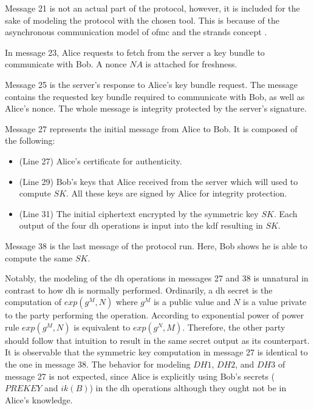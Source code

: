 \par
Message 21 is not an actual part of the protocol, however, it is included for the sake of modeling the protocol with the chosen tool. This is because of the asynchronous communication model of \gls{ofmc} and the strands concept \cite{ofmcTut}.
\par 
In message 23, Alice requests to fetch from the server a key bundle to communicate with Bob. A nonce $NA$ is attached for freshness.
\par
Message 25 is the server's response to Alice's key bundle request. The message contains the requested key bundle required to communicate with Bob, as well as Alice's nonce. The whole message is integrity protected by the server's signature.
\par
Message 27 represents the initial message from Alice to Bob. It is composed of the following:
\begin{itemize}
	\item (Line 27) Alice's certificate for authenticity.
	\item (Line 29) Bob's keys that Alice received from the server which will used to compute $SK$. All these keys are signed by Alice for integrity protection.
	\item (Line 31) The initial ciphertext encrypted by the symmetric key $SK$. Each output of the four \gls{dh} operations is input into the \gls{kdf} resulting in $SK$.
\end{itemize}
Message 38 is the last message of the protocol run. Here, Bob shows he is able to compute the same $SK$. 
\par
Notably, the modeling of the \gls{dh} operations in messages 27 and 38 is unnatural in contrast to how \gls{dh} is normally performed. Ordinarily, a \gls{dh} secret is the computation of $exp(g^{M},N)$ where $g^{M}$ is a public value and $N$ is a value private to the party performing the operation. According to exponential power of power rule $exp(g^{M},N)$ is equivalent to $exp(g^{N},M)$. Therefore, the other party should follow that intuition to result in the same secret output as its counterpart. 
It is observable that the symmetric key computation in message 27 is identical to the one in message 38.
The behavior for modeling $DH1$, $DH2$, and $DH3$ of message 27 is not expected, since Alice is explicitly using Bob's secrets ($PREKEY$ and $ik(B)$) in the \gls{dh} operations although they ought not be in Alice's knowledge.
